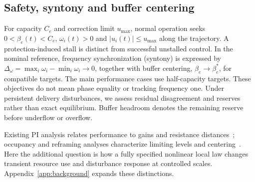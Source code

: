 \subsection{Safety, syntony and buffer centering}
For capacity $C_e$ and correction limit $u_{\max}$, normal operation
seeks $0<\beta_e(t)<C_e$, $\omega_i(t)>0$ and
$|u_i(t)|\le u_{\max}$ along the trajectory. A protection-induced
stall is distinct from successful unstalled control. In the nominal
reference, frequency synchronization (syntony) is expressed by
$\Delta_\omega=\max_i\omega_i-\min_i\omega_i\to0$, together with
buffer centering, $\beta_e\to\beta_e^*$, for compatible targets.
The main performance cases use half-capacity targets. These objectives
do not mean phase equality or tracking frequency one. Under persistent
delivery disturbances, we assess residual disagreement and reserves
rather than exact equilibrium. Buffer headroom denotes the remaining
reserve before underflow or overflow.

Existing PI analysis relates performance to gains and resistance
distances~\cite{lall2022resistance}; occupancy and reframing analyses
characterize limiting levels and centering~\cite{lall2024bufferOccupancy,lall2023bufferCentering}.
Here the additional question is how a fully specified nonlinear local
law changes transient resource use and disturbance response at
controlled scales. Appendix~\ref{app:background} expands these distinctions.
